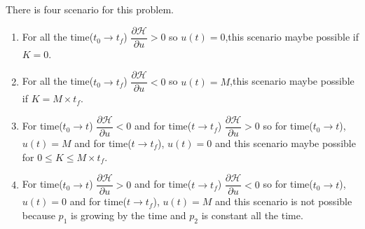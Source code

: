 There is four scenario for this problem.
\begin{enumerate}
	\item For all the time($t_0\to t_f$) $\dfrac{\partial \mathcal{H}}{\partial u} > 0$ so $u(t) = 0$,this scenario maybe possible if $K = 0$.
	\item For all the time($t_0\to t_f$) $\dfrac{\partial \mathcal{H}}{\partial u} < 0$ so $u(t) = M$,this scenario maybe possible if $K = M\times t_f$.
	\item For time($t_0\to t $) $\dfrac{\partial \mathcal{H}}{\partial u} < 0$ and 
	for time($t\to t_f $) $\dfrac{\partial \mathcal{H}}{\partial u} > 0$ so for time($t_0\to t $), $u(t) = M$ and  for time($t\to t_f$), $u(t) = 0$ and this scenario maybe possible for $0 \leq K \leq M\times t_f$.
	\item For time($t_0\to t $) $\dfrac{\partial \mathcal{H}}{\partial u} > 0$ and 
	for time($t\to t_f $) $\dfrac{\partial \mathcal{H}}{\partial u} < 0$ so for time($t_0\to t $), $u(t) = 0$ and  for time($t\to t_f$), $u(t) = M$ and this scenario is not possible because $p_1$ is growing by the time and $p_2$ is constant all the time.  
\end{enumerate}
